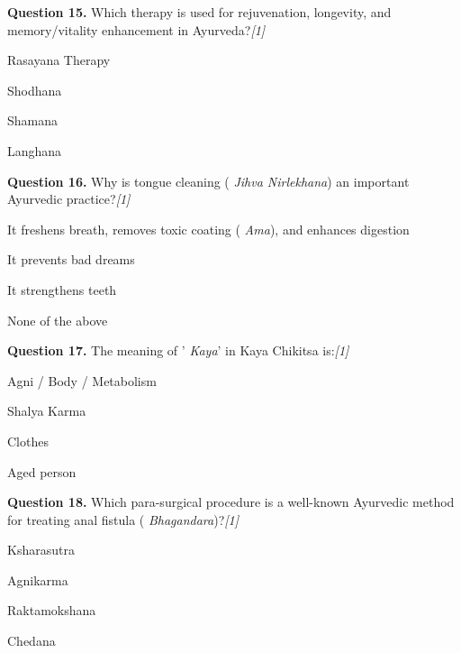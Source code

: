 \documentclass[11pt,a4paper]{article}
\newcommand{\pts}[1]{\hfill   \textit{[#1]}}
\begin{document}
\noindent   \textbf{Question 15.} Which therapy is used for rejuvenation, longevity, and memory/vitality enhancement in Ayurveda?\pts{1}

\begin{parts}
  \item Rasayana Therapy
  \item Shodhana
  \item Shamana
  \item Langhana
\end{parts}

\medskip




\noindent   \textbf{Question 16.} Why is tongue cleaning (   \textit{Jihva Nirlekhana}) an important Ayurvedic practice?\pts{1}

\begin{parts}
  \item It freshens breath, removes toxic coating (   \textit{Ama}), and enhances digestion
  \item It prevents bad dreams
  \item It strengthens teeth
  \item None of the above
\end{parts}

\medskip




\noindent   \textbf{Question 17.} The meaning of '   \textit{Kaya}' in Kaya Chikitsa is:\pts{1}

\begin{parts}
  \item Agni / Body / Metabolism
  \item Shalya Karma
  \item Clothes
  \item Aged person
\end{parts}

\medskip




\noindent   \textbf{Question 18.} Which para-surgical procedure is a well-known Ayurvedic method for treating anal fistula (   \textit{Bhagandara})?\pts{1}

\begin{parts}
  \item Ksharasutra
  \item Agnikarma
  \item Raktamokshana
  \item Chedana
\end{parts}
\end{document}
